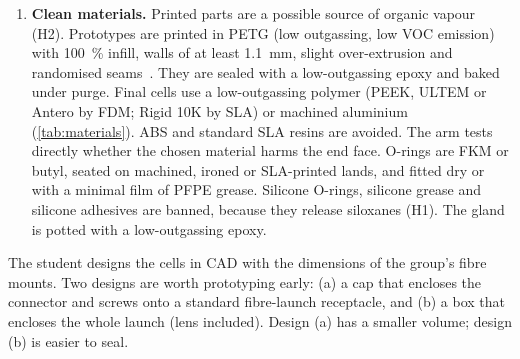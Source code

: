 \begin{enumerate}
        \SI{\sim0.5}{ppm}, read through a window so that no electronics sit inside the cell and shielded
        from the UV beam) and a colour indicator for gross failures monitor the atmosphere. Each cell is
        qualified by its rate of rise. With an FKM window O-ring alone, \Oxy{} would rise by tens of ppm
        per day in a sealed \SI{30}{cm^3} cell without an absorber (\cref{app:estimates}).
  \item \textbf{Clean materials.} Printed parts are a possible source of organic vapour (H2). Prototypes
        are printed in PETG (low outgassing, low VOC emission) with \SI{100}{\percent} infill, walls of at
        least \SI{1.1}{mm}, slight over-extrusion and randomised seams~\cite{Gordeev2018}. They are sealed
        with a low-outgassing epoxy and baked under \Ntwo{} purge. Final cells use a low-outgassing
        polymer (PEEK, ULTEM or Antero by FDM; Rigid 10K by SLA) or machined aluminium
        (\cref{tab:materials}). ABS and standard SLA resins are avoided. The  arm tests directly
        whether the chosen material harms the end face. O-rings are FKM or butyl, seated on machined,
        ironed or SLA-printed lands, and fitted dry or with a minimal film of PFPE grease. Silicone O-rings,
        silicone grease and silicone adhesives are banned, because they release siloxanes (H1). The gland
        is potted with a low-outgassing epoxy.
\end{enumerate}
The student designs the cells in CAD with the dimensions of the group's fibre mounts. Two designs are
worth prototyping early: (a) a cap that encloses the connector and screws onto a standard
fibre-launch receptacle, and (b) a box that encloses the whole launch (lens included). Design (a) has a
smaller volume; design (b) is easier to seal.

